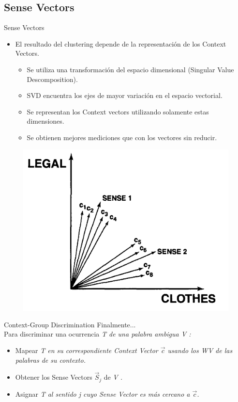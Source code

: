 \documentclass[xcolor=x11names,compress]{beamer}
\renewcommand{\(}{\begin{columns}}
\renewcommand{\)}{\end{columns}}
\newcommand{\<}[1]{\begin{column}{#1}}
\renewcommand{\>}{\end{column}}
\begin{document}
\subsection{Sense Vectors}
\begin{frame}{Sense Vectors}
\begin{itemize}
\item El resultado del clustering depende de la representación de los Context Vectors.
\begin{itemize}
\item Se utiliza una transformación del espacio dimensional (Singular Value Descomposition).
\item SVD encuentra los ejes de mayor variación en el espacio vectorial.
\item Se representan los Context vectors utilizando solamente estas dimensiones.
\item Se obtienen mejores mediciones que con los vectores sin reducir.
\end{itemize}
\end{itemize}
\begin{figure}
\centering
\includegraphics[scale=0.24, keepaspectratio=True, natwidth=800,natheight=600]{sense_vector.png}
\end{figure}
\end{frame}


\begin{frame}{Context-Group Discrimination}
Finalmente...\\
Para discriminar una ocurrencia \em T \em de una palabra ambigua \em V \em:
\begin{itemize}
\item Mapear \em T \em en su correspondiente Context Vector $\vec c$ usando los WV de las palabras de su contexto.
\item Obtener los Sense Vectors $\vec S_j$ de \em V \em.
\item Asignar \em T \em al sentido \em j \em cuyo Sense Vector es más cercano a $\vec c$.
\end{itemize}
\end{frame}
\end{document}
